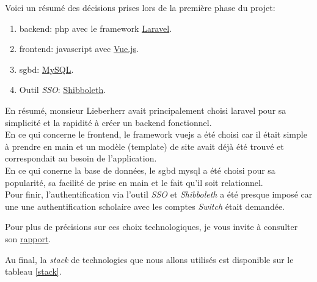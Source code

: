 \documentclass[
    iai, %
    il, %
]{heig-tb}
\begin{document}
Voici un résumé des décisions prises lors de la première phase du projet:
\begin{enumerate}
    \item \Gls{backend}: \Gls{php} avec le \Gls{framework} \href{https://laravel.com/}{Laravel}.
    \item \Gls{frontend}: \Gls{javascript} avec \href{https://vuejs.org/}{Vue.js}.
    \item \Gls{sgbd}: \href{https://www.mysql.com/}{MySQL}.
    \item Outil \emph{SSO}: \href{https://www.switch.ch/aai/about/shibboleth/}{Shibboleth}.
\end{enumerate}

En résumé, monsieur Lieberherr avait principalement choisi \Gls{laravel} pour sa simplicité et la rapidité à créer un \Gls{backend} fonctionnel. \\
En ce qui concerne le \Gls{frontend}, le \Gls{framework} \Gls{vuejs} a été choisi car il était simple à prendre en main et un modèle (\Gls{template}) de site avait déjà été trouvé et correspondait au besoin de l'application. \\
En ce qui conerne la base de données, le \Gls{sgbd} \Gls{mysql} a été choisi pour sa popularité, sa facilité de prise en main et le fait qu'il soit relationnel. \\
Pour finir, l'authentification via l'outil \emph{SSO} et \emph{Shibboleth} a été presque imposé car une une authentification scholaire avec les comptes \emph{Switch} était demandée.

Pour plus de précisions sur ces choix technologiques, je vous invite à consulter son \href{https://tb.heig-vd.ch/7532}{rapport}.

Au final, la \emph{stack} de technologies que nous allons utilisés est disponible sur le tableau \ref{stack}.
\end{document}
